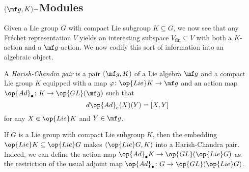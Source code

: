 \documentclass[../notes.tex]{subfiles}
\begin{document}
\subsection{\texorpdfstring{$(\mf g,K)-$}{(g, K)-}Modules}
Given a Lie group $G$ with compact Lie subgroup $K\subseteq G$, we now see that any Fr\'echet representation $V$ yields an interesting subspace $V_{\mathrm{fin}}\subseteq V$ with both a $K$-action and a $\mf g$-action. We now codify this sort of information into an algebraic object.
\begin{definition}
	A \textit{Harish-Chandra pair} is a pair $(\mf g,K)$ of a Lie algebra $\mf g$ and a compact Lie group $K$ equipped with a map $\varphi\colon\op{Lie}K\to\mf g$ and an action map $\op{Ad}_\bullet\colon K\to\op{GL}(\mf g)$ such that
	\[d\op{Ad}_e(X)(Y)=[X,Y]\]
	for any $X\in\op{Lie}K$ and $Y\in\mf g$.
\end{definition}
\begin{example} \label{ex:prototypical-g-k-pair}
	If $G$ is a Lie group with compact Lie subgroup $K$, then the embedding $\op{Lie}K\subseteq\op{Lie}G$ makes $(\op{Lie}G,K)$ into a Harish-Chandra pair. Indeed, we can define the action map $\op{Ad}_\bullet K\to\op{GL}(\op{Lie}G)$ as the restriction of the usual adjoint map $\op{Ad}_\bullet\colon G\to\op{GL}(\op{Lie}G)$.
\end{example}
\end{document}
